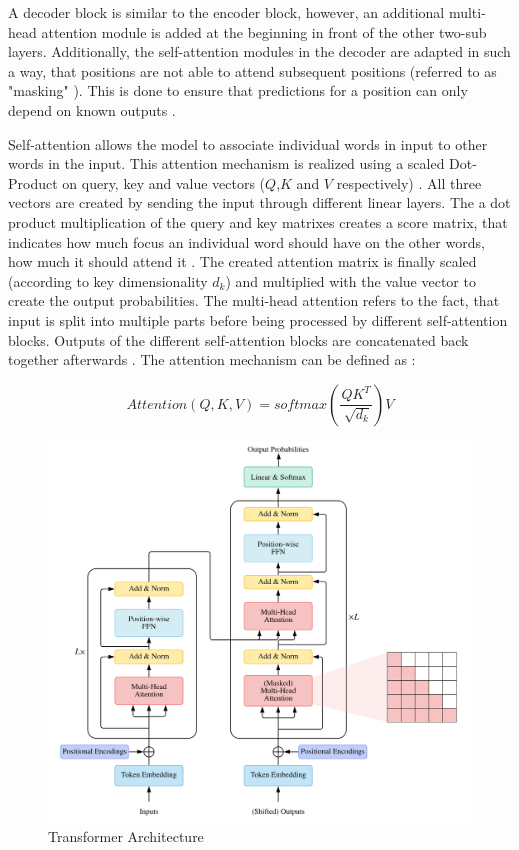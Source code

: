 A decoder block is similar to the encoder block, however, an additional multi-head attention module is added at the beginning in front of the other two-sub layers.
Additionally, the self-attention modules in the decoder are adapted in such a way, that positions are not able to attend subsequent positions (referred to as "masking" \cite[p. 3]{vaswani2017AttentionAllYou}).
This is done to ensure that predictions for a position can only depend on known outputs \cite{vaswani2017AttentionAllYou, lin2022SurveyTransformers}.

Self-attention allows the model to associate individual words in input to other words in the input.
This attention mechanism is realized using a scaled Dot-Product on query, key and value vectors ($Q$,$K$ and $V$ respectively) \cite{vaswani2017AttentionAllYou}.
All three vectors are created by sending the input through different linear layers.
The a dot product multiplication of the query and key matrixes creates a score matrix, that indicates how much focus an individual word should have on the other words, \ie how much it should attend it \cite{vaswani2017AttentionAllYou}.
The created attention matrix is finally scaled (according to key dimensionality $d_k$) and multiplied with the value vector to create the output probabilities.
The multi-head attention refers to the fact, that input is split into multiple parts before being processed by different self-attention blocks.
Outputs of the different self-attention blocks are concatenated back together afterwards \cite{vaswani2017AttentionAllYou}.
The attention mechanism can be defined as \cite[p.4]{vaswani2017AttentionAllYou}:

\begin{equation}
  \label{eqn:attention}
  Attention(Q,K,V)=softmax(\frac{QK^T}{\sqrt[]{d_k}})V
\end{equation}


\begin{figure}

  \includegraphics[width=0.8\linewidth]{images/transformer.png}

\caption{Transformer Architecture} \label{fig:transformer}
\end{figure}


